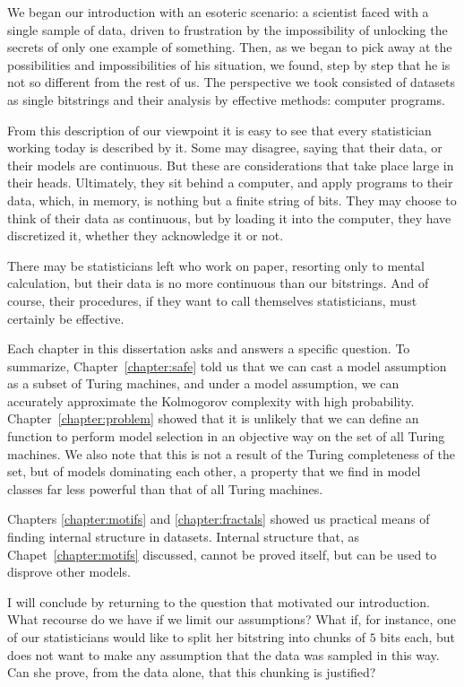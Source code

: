 
We began our introduction with an esoteric scenario: a scientist faced with a single sample  of data, driven to frustration by the impossibility of unlocking the secrets of only one example of something. Then, as we began to pick away at the possibilities and impossibilities of his situation, we found, step by step that he is not so different from the rest of us. The perspective we took consisted of datasets as single bitstrings and their analysis by effective methods: computer programs. 

From this description of our viewpoint it is easy to  see that every statistician working today is described  by it. Some may disagree, saying that their data, or their models are continuous. But these are considerations that take place large in their heads. Ultimately, they sit behind a computer, and apply programs to their data, which, in memory, is nothing but a finite string of bits. They may choose to think of their data as continuous, but by loading it into the computer, they have discretized it, whether they acknowledge it or not. 

There may be statisticians left who work on paper, resorting only to mental calculation, but their data is no more continuous than our bitstrings. And of course, their procedures, if they want to call themselves statisticians, must certainly be effective.  

Each chapter in this dissertation asks and answers a specific question. To summarize, Chapter~\ref{chapter:safe} told us that we can cast a model assumption as a subset of Turing machines, and under a model assumption, we can accurately approximate the Kolmogorov complexity with high probability. Chapter~\ref{chapter:problem} showed that it is unlikely that we can define an function to perform model selection in an objective way on the set of all Turing machines. We also note that this is not a result of the Turing completeness of the set, but of models dominating each other, a property that we find in model classes far less powerful than that of all Turing machines.   

Chapters \ref{chapter:motifs} and \ref{chapter:fractals} showed us practical means of finding internal structure in datasets. Internal structure that, as Chapet~\ref{chapter:motifs} discussed, cannot be proved itself, but can be used to disprove other models. 

I will conclude by returning to the question that motivated our introduction. What recourse do we have if we limit our assumptions? What if, for instance, one of our statisticians would like to split her bitstring into chunks of $5$ bits each, but does not want to make any assumption that the data was sampled in this way. Can she prove, from the data alone, that this chunking is justified?

